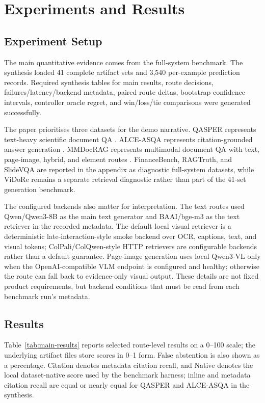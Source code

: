 \section{Experiments and Results}

\subsection{Experiment Setup}

The main quantitative evidence comes from the full-system benchmark. The synthesis loaded 41 complete artifact sets and 3,540 per-example prediction records. Required synthesis tables for main results, route decisions, failures/latency/backend metadata, paired route deltas, bootstrap confidence intervals, controller oracle regret, and win/loss/tie comparisons were generated successfully.

The paper prioritises three datasets for the demo narrative. QASPER represents text-heavy scientific document QA \citep{dasigi2021qasper}. ALCE-ASQA represents citation-grounded answer generation \citep{gao2023alce}. MMDocRAG represents multimodal document QA with text, page-image, hybrid, and element routes \citep{dong2025mmdocrag}. FinanceBench, RAGTruth, and SlideVQA are reported in the appendix as diagnostic full-system datasets, while ViDoRe remains a separate retrieval diagnostic rather than part of the 41-set generation benchmark.

The configured backends also matter for interpretation. The text routes used Qwen/Qwen3-8B as the main text generator and BAAI/bge-m3 as the text retriever in the recorded metadata. The default local visual retriever is a deterministic late-interaction-style smoke backend over OCR, captions, text, and visual tokens; ColPali/ColQwen-style HTTP retrievers are configurable backends rather than a default guarantee. Page-image generation uses local Qwen3-VL only when the OpenAI-compatible VLM endpoint is configured and healthy; otherwise the route can fall back to evidence-only visual output. These details are not fixed product requirements, but backend conditions that must be read from each benchmark run's metadata.

\subsection{Results}

Table~\ref{tab:main-results} reports selected route-level results on a 0--100 scale; the underlying artifact files store scores in 0--1 form. False abstention is also shown as a percentage. Citation denotes metadata citation recall, and Native denotes the local dataset-native score used by the benchmark harness; inline and metadata citation recall are equal or nearly equal for QASPER and ALCE-ASQA in the synthesis.

